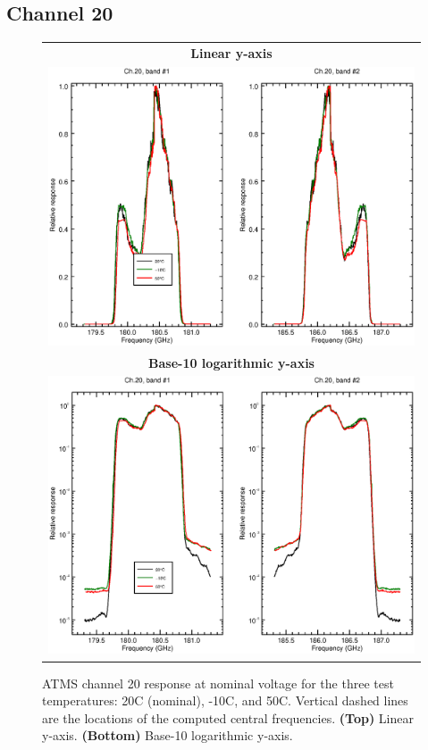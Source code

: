\subsection{Channel 20}
\begin{figure}[H]
  \label{fig:Tset.ch20_response}
  \centering
  \begin{tabular}{c}
    \hspace{0.75cm}\sffamily\textbf{Linear y-axis} \\
    \includegraphics[scale=0.55]{graphics/srf/Tset/lin/atms_npp-20.eps} \\
    \hspace{0.75cm}\sffamily\textbf{Base-10 logarithmic y-axis} \\
    \includegraphics[scale=0.55]{graphics/srf/Tset/log/atms_npp-20.eps}
  \end{tabular}
  \caption{ATMS channel 20 response at nominal voltage for the three test temperatures: 20\textdegree{}C (nominal), -10\textdegree{}C, and 50\textdegree{}C. Vertical dashed lines are the locations of the computed central frequencies. \textbf{(Top)} Linear y-axis. \textbf{(Bottom)} Base-10 logarithmic y-axis.}
\end{figure}

